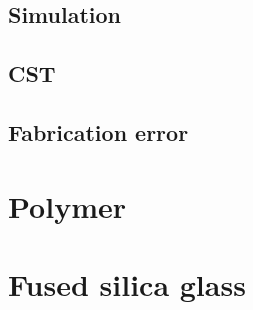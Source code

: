 
\subsection{Simulation}
\subsection{CST}
\subsection{Fabrication error}

\section{Polymer}

\section{Fused silica glass}



